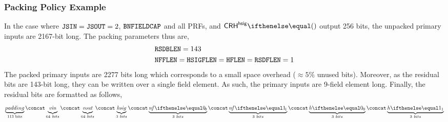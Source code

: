 \subsubsection{Packing Policy Example}

In the case where $\mathtt{JSIN}=\mathtt{JSOUT}=2$, $\mathtt{BNFIELDCAP}$ and all PRFs, and $\crhhsig{}$ output 256 bits, the unpacked primary inputs are 2167-bit long. The packing parameters thus are,
\begin{align*}
    & \mathtt{RSDBLEN} = 143 \\
    & \mathtt{NFFLEN} = \mathtt{HSIGFLEN} = \mathtt{HFLEN} = \mathtt{RSDFLEN} = 1
\end{align*}
The packed primary inputs are 2277 bits long which corresponds to a small space overhead ($\approx 5\%$ unused bits). Moreover, as the residual bits are 143-bit long, they can be written over a single field element. As such, the primary inputs are 9-field element long.
Finally, the residual bits are formatted as follows,
\[
    \underbrace{padding}_{\text{113 bits}} \concat \underbrace{\vin\vphantom{g}}_{64\ bits} \concat \underbrace{\vout\vphantom{g}}_{64\ bits} \concat \underbrace{\hsig}_{3\ bits} \concat \underbrace{\nf{0}}_{3\ bits} \concat \underbrace{\nf{1}}_{3\ bits} \concat \underbrace{\htag{0}}_{3\ bits} \concat \underbrace{\htag{1}}_{3\ bits}
\]
